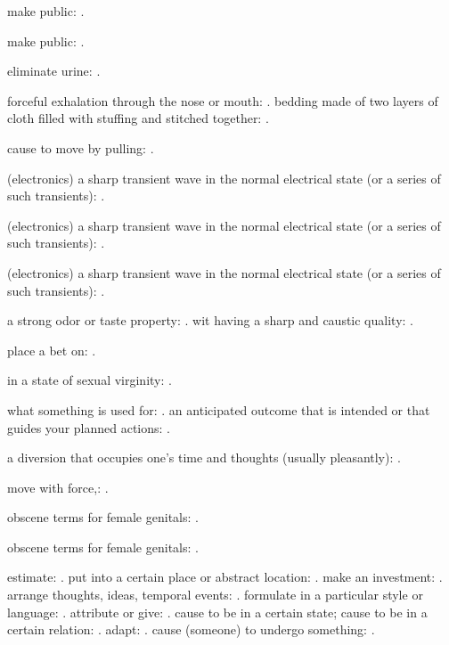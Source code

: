   make public: .

  make public: .

  eliminate urine: .

  forceful exhalation through the nose or mouth: . bedding made of two layers of cloth filled with stuffing and stitched together: .

  cause to move by pulling: .

  (electronics) a sharp transient wave in the normal electrical state (or a series of such transients): .

  (electronics) a sharp transient wave in the normal electrical state (or a series of such transients): .

  (electronics) a sharp transient wave in the normal electrical state (or a series of such transients): .

  a strong odor or taste property: . wit having a sharp and caustic quality: .

  place a bet on: .

  in a state of sexual virginity: .

  what something is used for: . an anticipated outcome that is intended or that guides your planned actions: .

  a diversion that occupies one's time and thoughts (usually pleasantly): .

  move with force,: .

  obscene terms for female genitals: .

  obscene terms for female genitals: .

  estimate: . put into a certain place or abstract location: . make an investment: . arrange thoughts, ideas, temporal events: . formulate in a particular style or language: . attribute or give: . cause to be in a certain state; cause to be in a certain relation: . adapt: . cause (someone) to undergo something: .

